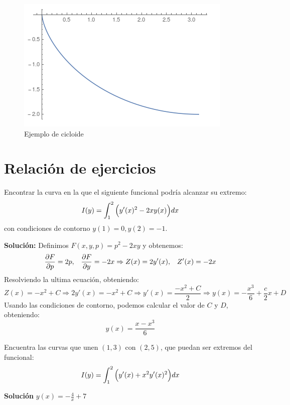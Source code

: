 \begin{figure}[!ht]
   \center
  \includegraphics[scale=0.5]{img/cicloide.png}
  \caption{Ejemplo de cicloide}
\end{figure}

\section{Relación de ejercicios}

\begin{ejercicio}
Encontrar la curva en la que el siguiente funcional podría alcanzar su extremo:
\[
I(y)=\displaystyle\int_{ 1 }^{ 2 } \Big(y'(x)^2-2xy(x)\Big)dx
\]
con condiciones de contorno $y(1)=0,y(2)=-1$.
\end{ejercicio}
\textbf{Solución:}
Definimos $F(x,y,p)=p^2-2xy$ y obtenemos:
\[
\frac{\partial F }{\partial p }=2p, \;\;\; \frac{\partial F }{\partial y }=-2x \Rightarrow Z(x)=2y'(x), \;\;\; Z'(x)=-2x
\]
Resolviendo la ultima ecuación, obteniendo:
\[
Z(x)=-x^2+C \Rightarrow 2y'(x)=-x^2+C \Rightarrow y'(x)=\frac{-x^2+C}{2}\Rightarrow y(x)=-\frac{x^3}{6}+\frac{c}{2}x+D
\]
Usando las condiciones de contorno, podemos calcular el valor de $C$ y $D$, obteniendo:
\[
y(x)=\frac{x-x^3}{6}
\]
\begin{ejercicio}
Encuentra las curvas que unen $(1,3)$ con $(2,5)$, que puedan ser extremos del funcional:
\[
I(y)=\displaystyle\int_{ 1 }^{ 2 } \Big(y'(x)+x^2y'(x)^2\Big)dx
\]
\end{ejercicio}

\textbf{Solución} $y(x)=-\frac{4}{x}+7$

